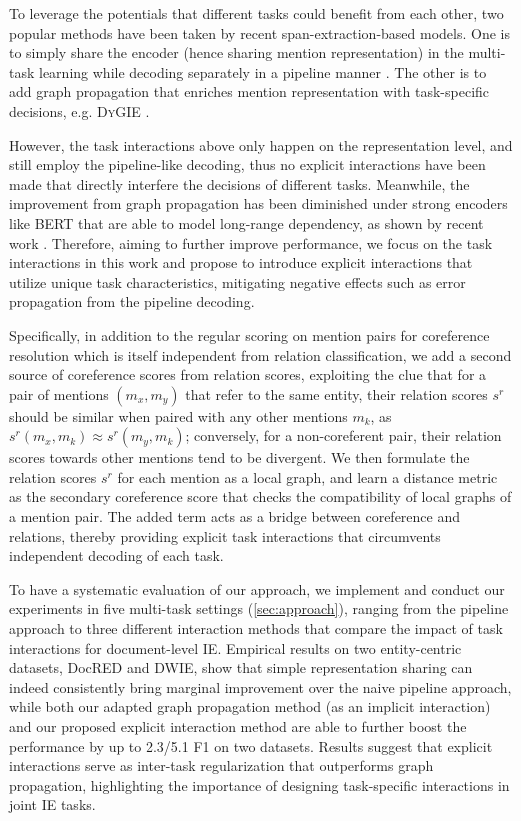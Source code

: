 \documentclass[11pt]{article}
\begin{document}
To leverage the potentials that different tasks could benefit from each other, two popular methods have been taken by recent span-extraction-based models.
One is to simply share the encoder (hence sharing mention representation) in the multi-task learning while decoding separately in a pipeline manner \cite{scierc,hierarchical-multi}.
The other is to add graph propagation that enriches mention representation with task-specific decisions, e.g. D\textsc{y}GIE \citep{dygie}.

However, the task interactions above only happen on the representation level, and still employ the pipeline-like decoding, thus no explicit interactions have been made that directly interfere the decisions of different tasks.
Meanwhile, the improvement from graph propagation has been diminished under strong encoders like BERT \citep{joshi-etal-2019-bert} that are able to model long-range dependency, as shown by recent work \citep{dygie++,xu-choi-2020-revealing,dwie}.
Therefore, aiming to further improve performance, we focus on the task interactions in this work and propose to introduce explicit interactions that utilize unique task characteristics, mitigating negative effects such as error propagation from the pipeline decoding.

Specifically, in addition to the regular scoring on mention pairs for coreference resolution which is itself independent from relation classification, we add a second source of coreference scores from relation scores, exploiting the clue that for a pair of mentions $(m_x, m_y)$ that refer to the same entity, their relation scores $s^r$ should be similar when paired with any other mentions $m_k$, as $s^r(m_x, m_k) \approx s^r(m_y, m_k)$; conversely, for a non-coreferent pair, their relation scores towards other mentions tend to be divergent.
We then formulate the relation scores $s^r$ for each mention as a local graph, and learn a distance metric as the secondary coreference score that checks the compatibility of local graphs of a mention pair.
The added term acts as a bridge between coreference and relations, thereby providing explicit task interactions that circumvents independent decoding of each task.

To have a systematic evaluation of our approach, we implement and conduct our experiments in five multi-task settings (\textsection\ref{sec:approach}), ranging from the pipeline approach to three different interaction methods that compare the impact of task interactions for document-level IE. Empirical results on two entity-centric datasets, DocRED and DWIE, show that simple representation sharing can indeed consistently bring marginal improvement over the naive pipeline approach, while both our adapted graph propagation method (as an implicit interaction) and our proposed explicit interaction method are able to further boost the performance by up to 2.3/5.1 F1 on two datasets. Results suggest that explicit interactions serve as inter-task regularization that outperforms graph propagation, highlighting the importance of designing task-specific interactions in joint IE tasks.
\end{document}
